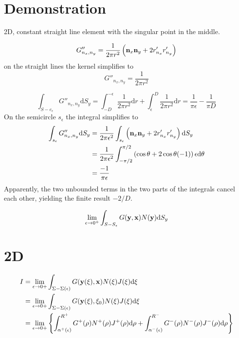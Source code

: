 \documentclass[a4paper,11pt]{article}
\newcommand{\td}{\mathrm{d}}
\begin{document}
\section{Demonstration}

2D, constant straight line element with the singular point in the middle.

\begin{equation}
G''_{n_x, n_y} = \frac{1}{2\pi r^2} \left({\bf n}_x {\bf n}_y + 2 r'_{n_x} r'_{n_y}\right)
\end{equation}
%
on the straight lines the kernel simplifies to
%
\begin{equation}
G''_{n_x, n_y} = \frac{1}{2\pi r^2}
\end{equation}

\begin{equation}
\int_{S-e_{\epsilon}} G''_{n_x,n_y} \td S_y
=
\int_{-D}^{-\epsilon} \frac{1}{2\pi r^2} \td r + \int_{\epsilon}^{D} \frac{1}{2\pi r^2} \td r
=
\frac{1}{\pi \epsilon} - \frac{1}{\pi D}
\end{equation}
%
On the semicircle $s_{\epsilon}$ the integral simplifies to
%
\begin{align}
\int_{s_{\epsilon}} G''_{n_x,n_y} \td S_y
&=
\frac{1}{2\pi\epsilon^2}\int_{s_{\epsilon}} \left({\bf n}_x{\bf n}_y + 2 r'_{n_x} r'_{n_y}\right) \td S_y \nonumber \\
&=
\frac{1}{2\pi \epsilon^2} \int_{-\pi/2}^{\pi/2} \left(\cos\theta + 2 \cos\theta (-1)\right) \epsilon \td \theta \nonumber \\
&= \frac{-1}{\pi\epsilon}
\end{align}
%
Apparently, the two unbounded terms in the two parts of the integrals cancel each other, yielding the finite result $-2/D$.


\begin{equation}
\lim_{\epsilon\to0^+}\int_{S-S_{\epsilon}} G({\bf y}, {\bf x}) N({\bf y}) \td S_y
\end{equation}

\section{2D}

\begin{align}
I &= \lim_{\epsilon \to 0+} \int_{\Sigma-\Sigma(\epsilon)} G({\bf y}(\xi), {\bf x}) N(\xi) J(\xi) \td \xi \nonumber \\
&= \lim_{\epsilon \to 0+} \int_{\Sigma-\Sigma(\epsilon)} G({\bf y}(\xi), \xi_0) N(\xi) J(\xi) \td \xi \nonumber \\
&= \lim_{\epsilon \to 0+} \left\{ \int_{\alpha^+(\epsilon)}^{R^+} G^+(\rho) N^+(\rho) J^+(\rho) \td \rho +
\int_{\alpha^-(\epsilon)}^{R^-} G^-(\rho) N^-(\rho) J^-(\rho) \td \rho
\right\}
\end{align}
\end{document}
